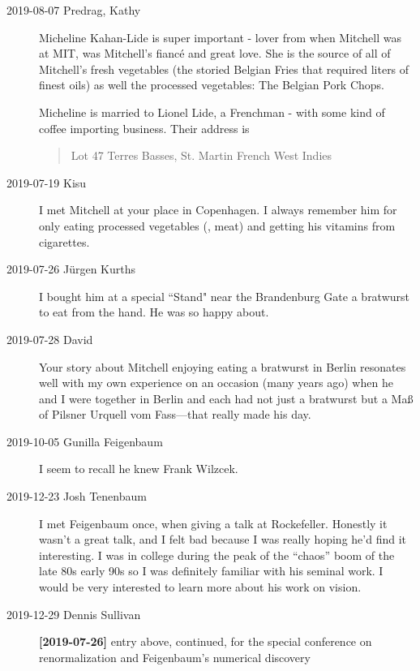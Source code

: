 \begin{description}

\item[2019-08-07 Predrag, Kathy]
Micheline Kahan-Lide is super important - lover from when Mitchell was at
MIT, was Mitchell's fianc\'e and great love. She is the source of all of
Mitchell's fresh vegetables (the storied Belgian Fries that required
liters of finest oils) as well the processed vegetables: The Belgian Pork
Chops.

Micheline is married to Lionel Lide, a Frenchman - with some kind of
coffee importing business. Their address is
\begin{quote}
Lot 47
Terres Basses,
St. Martin
French West Indies
\end{quote}

\item[2019-07-19 Kisu] I met Mitchell at your place in Copenhagen. I
always remember him for only eating processed vegetables (\ie, meat) and
getting his vitamins from cigarettes.

\item[2019-07-26 Jürgen Kurths] %
 I bought him at a special ``Stand" near the Brandenburg Gate a
bratwurst to eat from the hand. He was so happy about.

\item[2019-07-28 David]
Your story about Mitchell enjoying eating a bratwurst in Berlin
resonates well with my own experience on an occasion (many years ago)
when he and I were together in Berlin and each had not just a bratwurst
but  a Maß of Pilsner Urquell vom Fass—that really made his day.

\item[2019-10-05 Gunilla Feigenbaum] %
I seem to recall he knew Frank Wilzcek.

\item[2019-12-23 Josh Tenenbaum] %
I met Feigenbaum once, when giving a talk at Rockefeller.  Honestly it
wasn't a great talk, and I felt bad because I was really hoping he'd find
it interesting. I was in college during the peak of the ``chaos'' boom of
the late 80s early 90s so I was definitely familiar with his seminal
work.  I would be very interested to learn more about his work on vision.

\item[2019-12-29 Dennis Sullivan]
{\bf [2019-07-26]} entry above, continued,
for the special conference on renormalization and Feigenbaum's numerical discovery


\end{description}
